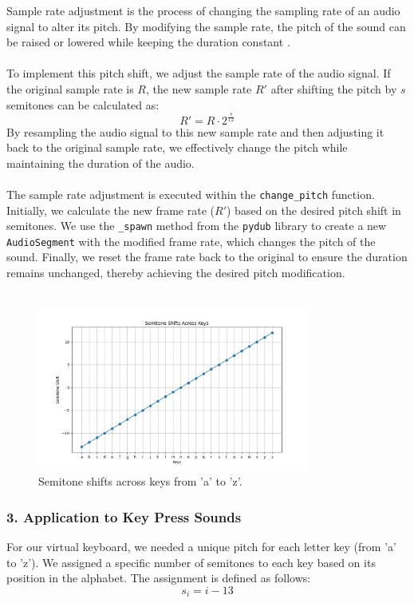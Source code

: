 Sample rate adjustment is the process of changing the sampling rate of an audio signal to alter its pitch. By modifying the sample rate, the pitch of the sound can be raised or lowered while keeping the duration constant \cite{jones2003}. \\ \\
\noindent
To implement this pitch shift, we adjust the sample rate of the audio signal. If the original sample rate is \( R \), the new sample rate \( R' \) after shifting the pitch by \( s \) semitones can be calculated as:
\begin{equation}
R' = R \cdot 2^{\frac{s}{12}}
\end{equation}
By resampling the audio signal to this new sample rate and then adjusting it back to the original sample rate, we effectively change the pitch while maintaining the duration of the audio. \\ \\
The sample rate adjustment is executed within the \texttt{change\_pitch} function. Initially, we calculate the new frame rate (\( R' \)) based on the desired pitch shift in semitones. We use the \texttt{\_spawn} method from the \texttt{pydub} library to create a new \texttt{AudioSegment} with the modified frame rate, which changes the pitch of the sound. Finally, we reset the frame rate back to the original to ensure the duration remains unchanged, thereby achieving the desired pitch modification.\\ \\
\noindent
\begin{figure}[h!]
\centering
\includegraphics[width=0.8\textwidth]{Development/semitone_shifts.png}
\caption{Semitone shifts across keys from 'a' to 'z'.}
\end{figure} 




\subsubsection*{3. Application to Key Press Sounds}
For our virtual keyboard, we needed a unique pitch for each letter key (from 'a' to 'z'). We assigned a specific number of semitones to each key based on its position in the alphabet. The assignment is defined as follows:
\begin{equation}
s_i = i - 13
\end{equation}

